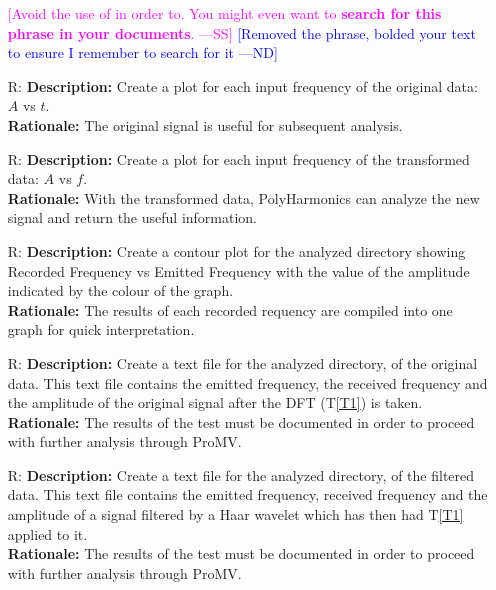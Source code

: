 \documentclass[12pt]{article}
\newcommand{\authornote}[3]{\textcolor{#1}{[#3 ---#2]}}
\newcommand{\authornote}[3]{}
\newcommand{\wss}[1]{\authornote{magenta}{SS}{#1}}
\newcommand{\nd}[1]{\authornote{blue}{ND}{#1}}
\newcounter{reqnum} %
\newcommand{\progname}{PolyHarmonics}
\begin{document}
\begin{itemize}
\wss{Avoid the use of in order to.  You might even want to \textbf{search for 
this
  phrase in your documents}.} \nd{Removed the phrase, bolded your text to ensure 
I remember to search for it}

\item[R\refstepcounter{reqnum}\thereqnum \label{R_Plot1}:]
\textbf{Description:} Create a plot for each input frequency of the original
 data: $A$ vs $t$.\\
\textbf{Rationale:} The original signal is useful for subsequent analysis.

\item[R\refstepcounter{reqnum}\thereqnum \label{R_Plot2}:]
\textbf{Description:} Create a plot for each input frequency of the 
transformed data: $A$ vs $f$.\\
\textbf{Rationale:} With the transformed data, \progname{} can analyze the
 new signal and return the useful information.

\item[R\refstepcounter{reqnum}\thereqnum \label{R_ContourPlot}:]
\textbf{Description:} Create a contour plot for the analyzed directory
 showing Recorded Frequency vs Emitted Frequency with the value of the
amplitude indicated by the colour of the graph.\\
\textbf{Rationale:} The results of each recorded requency are compiled
into one graph for quick interpretation.

\item[R\refstepcounter{reqnum}\thereqnum \label{R_TextOriginal}:]
\textbf{Description:} Create a text file for the analyzed directory, of 
the original data. This text file contains the emitted frequency, the received
 frequency and the amplitude of the original signal after 
the DFT (T\ref{T1}) is taken. \\
\textbf{Rationale:} The results of the test must be documented in order
to proceed with further analysis through ProMV.

\item[R\refstepcounter{reqnum}\thereqnum \label{R_TextFiltered}:]
\textbf{Description:} Create a text file for the analyzed directory, of the 
filtered data. This text file contains the emitted frequency, received 
frequency and the amplitude of a signal filtered by a Haar wavelet 
which has then had T\ref{T1} applied to it. \\
\textbf{Rationale:} The results of the test must be documented in order
to proceed with further analysis through ProMV.


\end{itemize}
\end{document}
